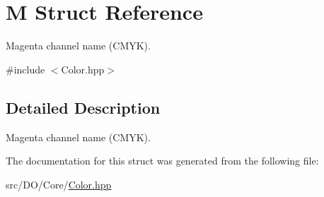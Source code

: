 \hypertarget{struct_d_o_1_1_m}{\section{M Struct Reference}
\label{struct_d_o_1_1_m}
}


Magenta channel name (C\-M\-Y\-K).  




{\ttfamily \#include $<$Color.\-hpp$>$}



\subsection{Detailed Description}
Magenta channel name (C\-M\-Y\-K). 

The documentation for this struct was generated from the following file\-:\begin{DoxyCompactItemize}
\item 
src/\-D\-O/\-Core/\hyperlink{_color_8hpp}{Color.\-hpp}\end{DoxyCompactItemize}
